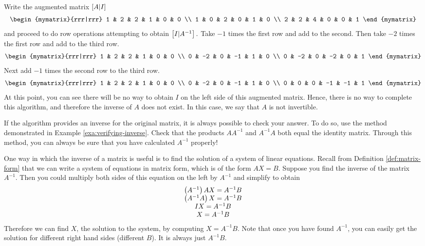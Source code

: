 \begin{solution} Write the augmented matrix $\left[A|I\right] $
\begin{equation*}
\begin{mymatrix}{rrr|rrr}
1 & 2 & 2 & 1 & 0 & 0 \\
1 & 0 & 2 & 0 & 1 & 0 \\
2 & 2 & 4 & 0 & 0 & 1
\end{mymatrix}
\end{equation*}
and proceed to do row operations attempting to obtain $\left[
I|A^{-1}\right] .$ Take $-1$ times the first row and add to the
second. Then take $ -2 $ times the first row and add to the
third row.
\begin{equation*}
\begin{mymatrix}{rrr|rrr}
1 & 2 & 2 & 1 & 0 & 0 \\
0 & -2 & 0 & -1 & 1 & 0 \\
0 & -2 & 0 & -2 & 0 & 1
\end{mymatrix}
\end{equation*}
Next add $-1 $ times the second row to the third row.
\begin{equation*}
\begin{mymatrix}{rrr|rrr}
1 & 2 & 2 & 1 & 0 & 0 \\
0 & -2 & 0 & -1 & 1 & 0 \\
0 & 0 & 0 & -1 & -1 & 1
\end{mymatrix}
\end{equation*}
At this point, you can see there will be no way to obtain $I$ on the
left side of this augmented matrix.  Hence, there is no way to
complete this algorithm, and therefore the inverse of $A$ does not
exist. In this case, we say that $A$ is not invertible.
\end{solution}

If the algorithm provides an inverse for the original matrix, it is always possible to check your answer.
To do so, use the method demonstrated in Example \ref{exa:verifying-inverse}. Check that the products $AA^{-1}$ and $A^{-1}A$ both equal the 
identity matrix. Through this method, you can always be sure that you have calculated $A^{-1}$ properly!

One way in which the inverse of a matrix is useful is to find the solution of a system of linear equations.
Recall from Definition \ref{def:matrix-form} that we can write a system of equations in matrix form, 
which is of the form $AX=B$. Suppose you find the
inverse of the matrix $A^{-1}$. Then you could multiply both sides of this
equation on the left by $A^{-1}$ and simplify to obtain
\begin{equation*}
\begin{array}{c}
\left(A^{-1} \right) AX =A^{-1}B \\
\left(A^{-1}A\right) X = A^{-1}B \\
IX = A^{-1}B \\
X = A^{-1}B
\end{array}
\end{equation*}
Therefore we can find $X$, the solution to the system, by computing $X=A^{-1}B$. 
Note that once you
have found $A^{-1}$, you can easily get the solution for different right
hand sides (different $B$). It is always just $A^{-1}B$. 
 
